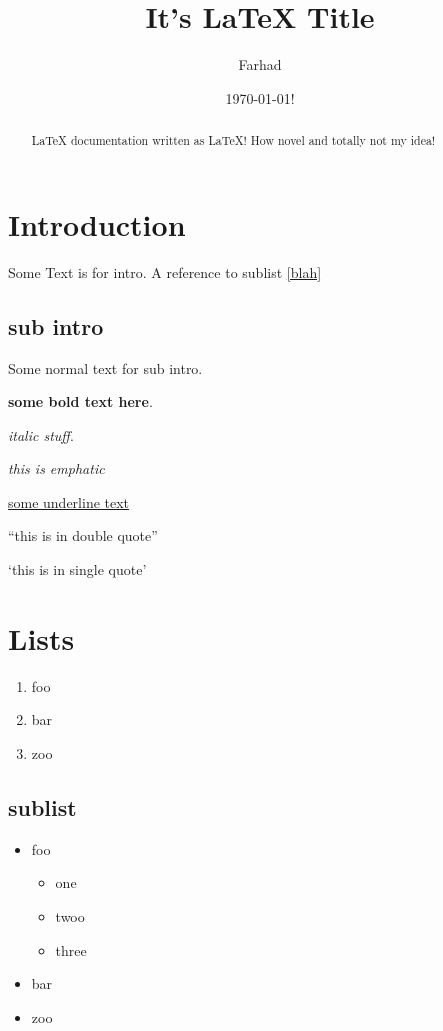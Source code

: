 \documentclass[16pt]{article}
\author{Farhad}
\title{It's {\LaTeX} Title}
\date{\today!}
\begin{document}
\maketitle

\newpage
\tableofcontents
\newpage

\begin{abstract}
 \LaTeX \hspace{1pt} documentation written as \LaTeX! How novel and totally not
 my idea!
\end{abstract}

\section*{Introduction}         %
Some Text is for intro. A reference to sublist \ref{blah}

\subsection{sub intro}

Some normal text for sub intro.

\textbf{some bold text here}.

\textit{italic stuff}.

\emph{this is emphatic}

\underline{some underline text}

``this is in double quote''

`this is in single quote'

\section{Lists}
\begin{enumerate}
\item foo
\item bar
\item zoo
\end{enumerate}

\subsection{sublist \label{blah}}
\begin{itemize}
\item foo
  \begin{itemize}
  \item one
  \item twoo
  \item three
  \end{itemize}
\item bar
\item zoo
\end{itemize}
\end{document}
